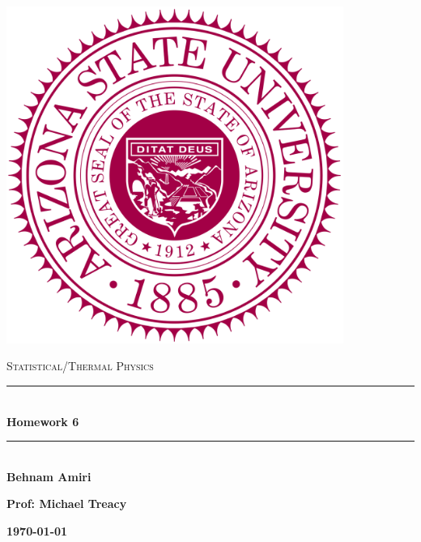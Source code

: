 \documentclass[fleqn]{article}
\begin{document}
  \begin{titlepage}

    \newcommand{\HRule}{\rule{\linewidth}{0.5mm}}

    \center

    \begin{center}
      \includegraphics[height=11cm, width=11cm]{asu.png}
    \end{center}

    \vline

    \textsc{\LARGE Statistical/Thermal Physics}\\[1.5cm]

    \HRule \\[0.5cm]
    { \huge \bfseries Homework 6}\\[0.4cm] 
    \HRule \\[1.0cm]

    \textbf{Behnam Amiri}

    \bigbreak

    \textbf{Prof: Michael Treacy}

    \bigbreak

    \textbf{{\large \today}\\[2cm]}

    \vfill

  \end{titlepage}
\end{document}
